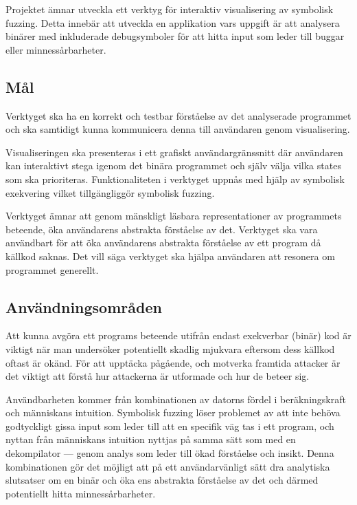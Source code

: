 
Projektet ämnar utveckla ett verktyg för interaktiv visualisering av symbolisk
fuzzing. Detta innebär att utveckla en applikation vars uppgift är att analysera
binärer med inkluderade debugsymboler för att hitta input som leder till
buggar eller minnessårbarheter.

\subsection{Mål}
Verktyget ska ha en korrekt och testbar förståelse av det analyserade programmet
och ska samtidigt kunna kommunicera denna till användaren genom visualisering.

Visualiseringen ska presenteras i ett grafiskt användargränssnitt där användaren
kan interaktivt stega igenom det binära programmet och själv välja vilka states
som ska prioriteras. Funktionaliteten i verktyget uppnås
med hjälp av symbolisk exekvering vilket tillgängliggör symbolisk fuzzing.

Verktyget ämnar att genom mänskligt läsbara representationer av programmets
beteende, öka användarens abstrakta förståelse av det. Verktyget ska vara
användbart för att öka användarens abstrakta förståelse av ett program då källkod
saknas. Det vill säga verktyget ska hjälpa användaren att resonera om programmet
generellt.

\subsection{Användningsområden}
Att kunna avgöra ett programs beteende utifrån endast exekverbar (binär)
kod är viktigt när man undersöker potentiellt skadlig mjukvara eftersom
dess källkod oftast är okänd. För att upptäcka pågående, och motverka
framtida attacker är det viktigt att förstå hur attackerna är utformade och
hur de beteer sig.

Användbarheten kommer från kombinationen av datorns fördel i beräkningskraft
och människans intuition. Symbolisk fuzzing löser problemet av att inte behöva godtyckligt
gissa input som leder till att en specifik väg tas i ett program, och nyttan från människans
intuition nyttjas på samma sätt som med en dekompilator --- genom analys som
leder till ökad förståelse och insikt. Denna kombinationen gör det möjligt att på ett
användarvänligt sätt dra analytiska slutsatser om en binär och öka ens abstrakta
förståelse av det och därmed potentiellt hitta minnessårbarheter.
